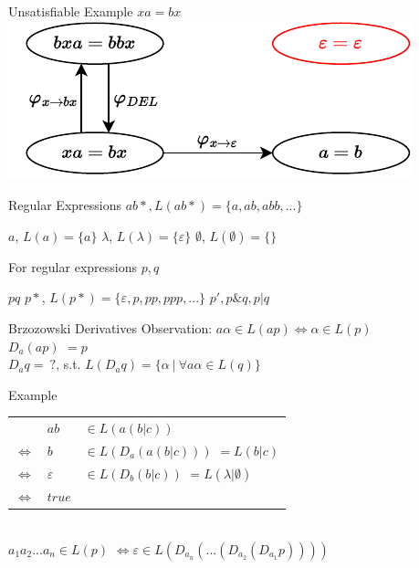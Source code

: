 \documentclass[xcolor=table]{beamer}
\begin{document}
\begin{frame}{Unsatisfiable Example $xa = bx$}
\includegraphics[]{images/xa_bx/xa_bx-5.pdf}
\end{frame}

\begin{frame}{Regular Expressions}
\pause
$ab*$\pause$, L(ab*) = \{a, ab, abb, ...\}$ \\

\begin{outline}
    \pause
    \1 $a$, $L(a) = \{a\}$
    \pause
    \1 $\lambda$, $L(\lambda) = \{\varepsilon\}$
    \pause
    \1 $\emptyset$, $L(\emptyset) = \{\}$
\end{outline}

\pause
For regular expressions $p, q$
\begin{outline}
    \pause
    \1 $pq$
    \pause
    \1 $p*$, $L(p*) = \{\varepsilon, p, pp, ppp, ...\}$
    \pause
    \1 $p', p\&q, p|q$
\end{outline}
\end{frame}

\begin{frame}{Brzozowski Derivatives}
Observation: $a\alpha \in L(ap) \Leftrightarrow \alpha \in L(p)$ \\
\pause
$D$\pause$_a$\pause$(ap)$ \pause $= p$ \\
\pause
$D_aq =\:?$\pause, s.t. $L(D_aq) = \{\alpha\:|\:\forall a\alpha \in L(q)\}$ 
\end{frame}

\begin{frame}{Example}
\begin{tabular}{c l l}
     & $ab$&$\in L(a(b|c))$ \\
     \pause
    $\Leftrightarrow$ & $b$&$\in L(D_a(a(b|c)))$ \pause $= L(b|c)$ \\
    \pause
    $\Leftrightarrow$ & $\varepsilon$&$\in L(D_b(b|c))$ \pause $= L(\lambda|\emptyset)$\\
    \pause
    $\Leftrightarrow$ & $true$ & \\
\end{tabular}

\pause
~\\

$a_1a_2...a_n \in L(p)$ \pause $\Leftrightarrow \varepsilon \in L(D_{a_n}(...(D_{a_2}(D_{a_1}p))))$
\end{frame}
\end{document}
